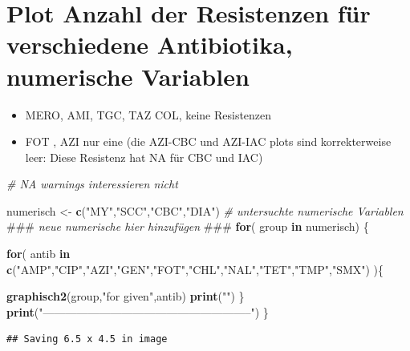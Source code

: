 \documentclass[
]{article}
\newenvironment{Shaded}{\begin{snugshade}}{\end{snugshade}}
\newcommand{\AlertTok}[1]{\textcolor[rgb]{0.94,0.16,0.16}{#1}}
\newcommand{\CommentTok}[1]{\textcolor[rgb]{0.56,0.35,0.01}{\textit{#1}}}
\newcommand{\ControlFlowTok}[1]{\textcolor[rgb]{0.13,0.29,0.53}{\textbf{#1}}}
\newcommand{\KeywordTok}[1]{\textcolor[rgb]{0.13,0.29,0.53}{\textbf{#1}}}
\newcommand{\NormalTok}[1]{#1}
\newcommand{\StringTok}[1]{\textcolor[rgb]{0.31,0.60,0.02}{#1}}
\providecommand{\tightlist}{%
  \setlength{\itemsep}{0pt}\setlength{\parskip}{0pt}}
\begin{document}
\hypertarget{plot-anzahl-der-resistenzen-fuxfcr-verschiedene-antibiotika-numerische-variablen}{%
\section{Plot Anzahl der Resistenzen für verschiedene Antibiotika,
numerische
Variablen}\label{plot-anzahl-der-resistenzen-fuxfcr-verschiedene-antibiotika-numerische-variablen}}

\begin{itemize}
\tightlist
\item
  MERO, AMI, TGC, TAZ COL, keine Resistenzen
\item
  FOT , AZI nur eine (die AZI-CBC und AZI-IAC plots sind korrekterweise
  leer: Diese Resistenz hat NA für CBC und IAC)
\end{itemize}

\begin{Shaded}
\begin{Highlighting}[]
\CommentTok{#   NA warnings interessieren nicht}
 
\NormalTok{numerisch <-}\StringTok{ }\KeywordTok{c}\NormalTok{(}\StringTok{"MY"}\NormalTok{,}\StringTok{"SCC"}\NormalTok{,}\StringTok{"CBC"}\NormalTok{,}\StringTok{"DIA"}\NormalTok{)     }\CommentTok{# untersuchte numerische Variablen  }\AlertTok{###}\CommentTok{ neue numerische hier hinzufügen }\AlertTok{###}
\ControlFlowTok{for}\NormalTok{( group }\ControlFlowTok{in}\NormalTok{ numerisch) \{   }

  \ControlFlowTok{for}\NormalTok{( antib }\ControlFlowTok{in} \KeywordTok{c}\NormalTok{(}\StringTok{"AMP"}\NormalTok{,}\StringTok{"CIP"}\NormalTok{,}\StringTok{"AZI"}\NormalTok{,}\StringTok{"GEN"}\NormalTok{,}\StringTok{"FOT"}\NormalTok{,}\StringTok{"CHL"}\NormalTok{,}\StringTok{"NAL"}\NormalTok{,}\StringTok{"TET"}\NormalTok{,}\StringTok{"TMP"}\NormalTok{,}\StringTok{"SMX"}\NormalTok{) )\{ }
  
    \KeywordTok{graphisch2}\NormalTok{(group,}\StringTok{"for given"}\NormalTok{,antib)  }
    \KeywordTok{print}\NormalTok{(}\StringTok{""}\NormalTok{)}
\NormalTok{  \} }
  \KeywordTok{print}\NormalTok{(}\StringTok{"--------------------------------------------------------"}\NormalTok{)}
\NormalTok{\}}
\end{Highlighting}
\end{Shaded}

\begin{verbatim}
## Saving 6.5 x 4.5 in image
\end{verbatim}
\end{document}
